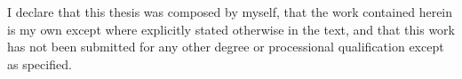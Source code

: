 \begin{declaration}

I declare that this thesis was composed by myself, that the work contained herein is my own except where explicitly stated otherwise in the text, and that this work has not been submitted for any other degree or processional qualification except as specified.

\end{declaration}